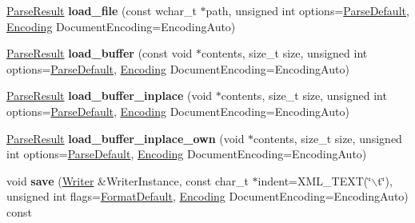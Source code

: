 \begin{DoxyCompactItemize}
\item 
\hypertarget{classphys_1_1xml_1_1Document_ad5414d48e539468d9caefd846eb78845}{
\hyperlink{structphys_1_1xml_1_1ParseResult}{ParseResult} {\bfseries load\_\-file} (const wchar\_\-t $\ast$path, unsigned int options=\hyperlink{namespacephys_1_1xml_aa6b8f7f8c2322fd683a235b498834d60}{ParseDefault}, \hyperlink{namespacephys_1_1xml_a420f5de782438f88160321385bea2015}{Encoding} DocumentEncoding=EncodingAuto)}
\label{dd/d44/classphys_1_1xml_1_1Document_ad5414d48e539468d9caefd846eb78845}

\item 
\hypertarget{classphys_1_1xml_1_1Document_a92ce092d1b7ea617a02ebbcbb7e30437}{
\hyperlink{structphys_1_1xml_1_1ParseResult}{ParseResult} {\bfseries load\_\-buffer} (const void $\ast$contents, size\_\-t size, unsigned int options=\hyperlink{namespacephys_1_1xml_aa6b8f7f8c2322fd683a235b498834d60}{ParseDefault}, \hyperlink{namespacephys_1_1xml_a420f5de782438f88160321385bea2015}{Encoding} DocumentEncoding=EncodingAuto)}
\label{dd/d44/classphys_1_1xml_1_1Document_a92ce092d1b7ea617a02ebbcbb7e30437}

\item 
\hypertarget{classphys_1_1xml_1_1Document_a86aac9113528f2f91a07b408366cc5b9}{
\hyperlink{structphys_1_1xml_1_1ParseResult}{ParseResult} {\bfseries load\_\-buffer\_\-inplace} (void $\ast$contents, size\_\-t size, unsigned int options=\hyperlink{namespacephys_1_1xml_aa6b8f7f8c2322fd683a235b498834d60}{ParseDefault}, \hyperlink{namespacephys_1_1xml_a420f5de782438f88160321385bea2015}{Encoding} DocumentEncoding=EncodingAuto)}
\label{dd/d44/classphys_1_1xml_1_1Document_a86aac9113528f2f91a07b408366cc5b9}

\item 
\hypertarget{classphys_1_1xml_1_1Document_a54ae4f27f7d4aef70f68e1c771fc1720}{
\hyperlink{structphys_1_1xml_1_1ParseResult}{ParseResult} {\bfseries load\_\-buffer\_\-inplace\_\-own} (void $\ast$contents, size\_\-t size, unsigned int options=\hyperlink{namespacephys_1_1xml_aa6b8f7f8c2322fd683a235b498834d60}{ParseDefault}, \hyperlink{namespacephys_1_1xml_a420f5de782438f88160321385bea2015}{Encoding} DocumentEncoding=EncodingAuto)}
\label{dd/d44/classphys_1_1xml_1_1Document_a54ae4f27f7d4aef70f68e1c771fc1720}

\item 
\hypertarget{classphys_1_1xml_1_1Document_a90c83e9875639c0979cc6846353f0bf7}{
void {\bfseries save} (\hyperlink{classphys_1_1xml_1_1Writer}{Writer} \&WriterInstance, const char\_\-t $\ast$indent=XML\_\-TEXT(\char`\"{}$\backslash$t\char`\"{}), unsigned int flags=\hyperlink{namespacephys_1_1xml_a08bf6aab51f79929d9097706a5e64408}{FormatDefault}, \hyperlink{namespacephys_1_1xml_a420f5de782438f88160321385bea2015}{Encoding} DocumentEncoding=EncodingAuto) const }
\label{dd/d44/classphys_1_1xml_1_1Document_a90c83e9875639c0979cc6846353f0bf7}


\end{DoxyCompactItemize}
